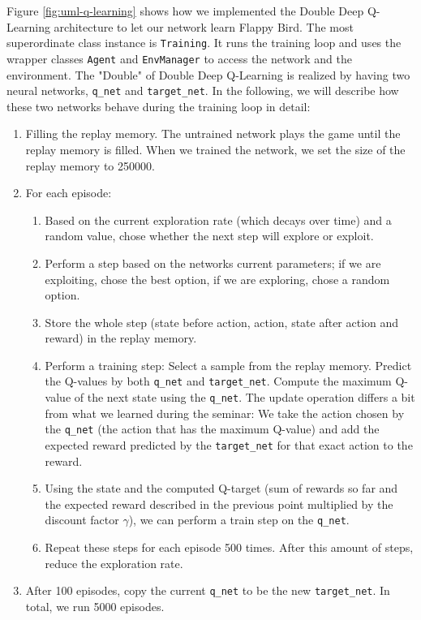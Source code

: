 Figure \ref{fig:uml-q-learning} shows how we implemented the Double Deep Q-Learning architecture to let our network learn Flappy Bird. The most superordinate class instance is \texttt{Training}. It runs the training loop and uses the wrapper classes \texttt{Agent} and \texttt{EnvManager} to access the network and the environment. The "Double" of Double Deep Q-Learning is realized by having two neural networks, \texttt{q_net} and \texttt{target_net}. In the following, we will describe how these two networks behave during the training loop in detail:
\begin{enumerate}
    \item Filling the replay memory. The untrained network plays the game until the replay memory is filled. When we trained the network, we set the size of the replay memory to 250000.
    \item For each episode:
    \begin{enumerate}
        \item Based on the current exploration rate (which decays over time) and a random value, chose whether the next step will explore or exploit.
        \item Perform a step based on the networks current parameters; if we are exploiting, chose the best option, if we are exploring, chose a random option.
        \item Store the whole step (state before action, action, state after action and reward) in the replay memory.
        \item Perform a training step: Select a sample from the replay memory. Predict the Q-values by both \texttt{q_net} and \texttt{target_net}. Compute the maximum Q-value of the next state using the \texttt{q_net}. The update operation differs a  bit from what we learned during the seminar: We take the action chosen by the \texttt{q_net} (the action that has the maximum Q-value) and add the expected reward predicted by the \texttt{target_net} for that exact action to the reward.
        \item Using the state and the computed Q-target (sum of rewards so far and the expected reward described in the previous point multiplied by the discount factor $\gamma$), we can perform a train step on the \texttt{q_net}.
        \item Repeat these steps for each episode 500 times. After this amount of steps, reduce the exploration rate.
    \end{enumerate}
    \item After 100 episodes, copy the current \texttt{q_net} to be the new \texttt{target_net}. In total, we run 5000 episodes.

\end{enumerate}
